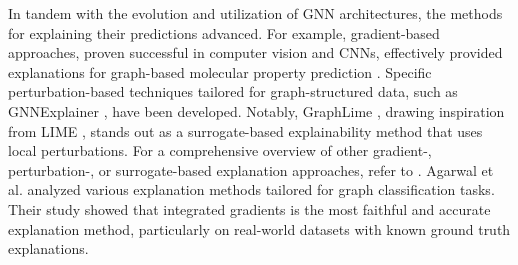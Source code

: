 In tandem with the evolution and utilization of GNN architectures, the methods for explaining their predictions advanced. For example, gradient-based approaches, proven successful in computer vision and CNNs, effectively provided explanations for graph-based molecular property prediction \cite{pope2019explainability}. Specific perturbation-based techniques tailored for graph-structured data, such as GNNExplainer \cite{ying2019gnnexplainer}, have been developed. Notably, GraphLime \cite{huang2022graphlime}, drawing inspiration from LIME \cite{ribeiro2016should}, stands out as a surrogate-based explainability method that uses local perturbations. For a comprehensive overview of other gradient-, perturbation-, or surrogate-based explanation approaches, refer to \cite{yuan2022explainability}.
Agarwal et al. \cite{agarwal2023evaluating} analyzed various explanation methods tailored for graph classification tasks. Their study showed that integrated gradients is the most faithful and accurate explanation method, particularly on real-world datasets with known ground truth explanations.
